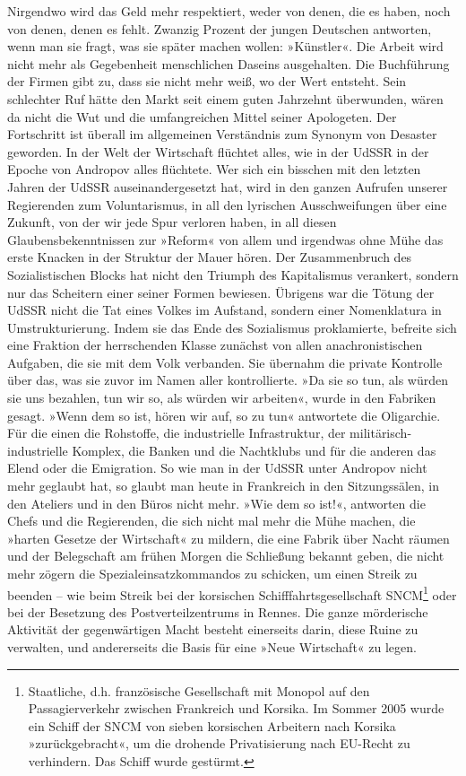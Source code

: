 Nirgendwo wird das Geld mehr respektiert, weder von denen, die es
haben, noch von denen, denen es fehlt. Zwanzig Prozent der jungen
Deutschen antworten, wenn man sie fragt, was sie später machen
wollen: »Künstler«. Die Arbeit wird nicht mehr als Gegebenheit
menschlichen Daseins ausgehalten. Die Buchführung der Firmen gibt
zu, dass sie nicht mehr weiß, wo der Wert entsteht. Sein schlechter
Ruf hätte den Markt seit einem guten Jahrzehnt überwunden, wären da
nicht die Wut und die umfangreichen Mittel seiner Apologeten. Der
Fortschritt ist überall im allgemeinen Verständnis zum Synonym von
Desaster geworden. In der Welt der Wirtschaft flüchtet alles, wie
in der UdSSR in der Epoche von Andropov alles flüchtete. Wer sich
ein bisschen mit den letzten Jahren der UdSSR auseinandergesetzt
hat, wird in den ganzen Aufrufen unserer Regierenden zum
Voluntarismus, in all den lyrischen Ausschweifungen über eine
Zukunft, von der wir jede Spur verloren haben, in all diesen
Glaubensbekenntnissen zur »Reform« von allem und irgendwas ohne
Mühe das erste Knacken in der Struktur der Mauer hören. Der
Zusammenbruch des Sozialistischen Blocks hat nicht den Triumph des
Kapitalismus verankert, sondern nur das Scheitern einer seiner
Formen bewiesen. Übrigens war die Tötung der UdSSR nicht die Tat
eines Volkes im Aufstand, sondern einer Nomenklatura in
Umstrukturierung. Indem sie das Ende des Sozialismus proklamierte,
befreite sich eine Fraktion der herrschenden Klasse zunächst von
allen anachronistischen Aufgaben, die sie mit dem Volk verbanden.
Sie übernahm die private Kontrolle über das, was sie zuvor im Namen
aller kontrollierte. »Da sie so tun, als würden sie uns bezahlen,
tun wir so, als würden wir arbeiten«, wurde in den Fabriken gesagt.
»Wenn dem so ist, hören wir auf, so zu tun« antwortete die
Oligarchie. Für die einen die Rohstoffe, die industrielle
Infrastruktur, der militärisch-industrielle Komplex, die Banken und
die Nachtklubs und für die anderen das Elend oder die Emigration.
So wie man in der UdSSR unter Andropov nicht mehr geglaubt hat, so
glaubt man heute in Frankreich in den Sitzungssälen, in den
Ateliers und in den Büros nicht mehr. »Wie dem so ist!«, antworten
die Chefs und die Regierenden, die sich nicht mal mehr die Mühe
machen, die »harten Gesetze der Wirtschaft« zu mildern, die eine
Fabrik über Nacht räumen und der Belegschaft am frühen Morgen die
Schließung bekannt geben, die nicht mehr zögern die
Spezialeinsatzkommandos zu schicken, um einen Streik zu beenden –
wie beim Streik bei der korsischen Schifffahrtsgesellschaft SNCM\footnote{
Staatliche, d.h. französische Gesellschaft mit Monopol auf den
Passagierverkehr zwischen Frankreich und Korsika. Im Sommer 2005
wurde ein Schiff der SNCM von sieben korsischen Arbeitern nach
Korsika »zurückgebracht«, um die drohende Privatisierung nach
EU-Recht zu verhindern. Das Schiff wurde gestürmt.
}
oder bei der Besetzung des Postverteilzentrums in Rennes. Die ganze
mörderische Aktivität der gegenwärtigen Macht besteht einerseits
darin, diese Ruine zu verwalten, und andererseits die Basis für
eine »Neue Wirtschaft« zu legen.
\extrapar{}

